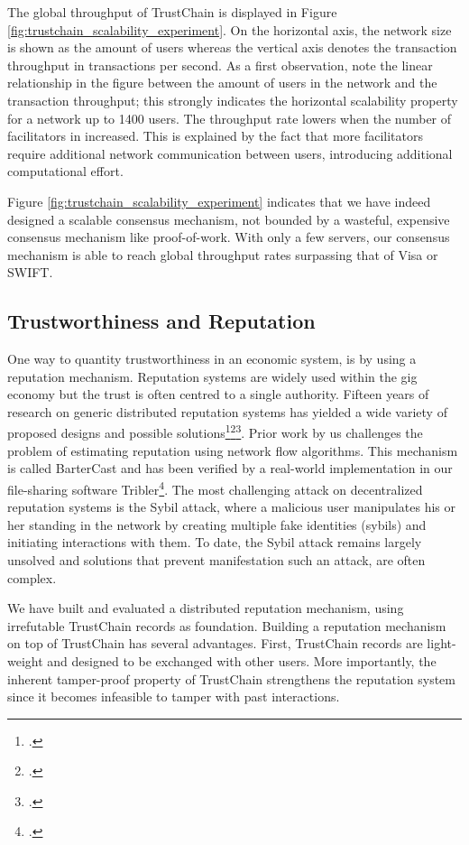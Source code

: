 \documentclass[USenglish]{article}
\begin{document}
The global throughput of TrustChain is displayed in Figure \ref{fig:trustchain_scalability_experiment}.
On the horizontal axis, the network size is shown as the amount of users whereas the vertical axis denotes the transaction throughput in transactions per second.
As a first observation, note the linear relationship in the figure between the amount of users in the network and the transaction throughput; this strongly indicates the horizontal scalability property for a network up to 1400 users.
The throughput rate lowers when the number of facilitators in increased. This is explained by the fact that more facilitators require additional network communication between users, introducing additional computational effort.

Figure \ref{fig:trustchain_scalability_experiment} indicates that we have indeed designed a scalable consensus mechanism, not bounded by a wasteful, expensive consensus mechanism like proof-of-work.
With only a few servers, our consensus mechanism is able to reach global throughput rates surpassing that of Visa or SWIFT.

\subsection{Trustworthiness and Reputation}
\label{sec:reputation}
One way to quantity trustworthiness in an economic system, is by using a reputation mechanism.
Reputation systems are widely used within the gig economy but the trust is often centred to a single authority.
Fifteen years of research on generic distributed reputation systems has yielded a wide variety of proposed designs and possible solutions\footcite{delaviz2010improving}\footcite{delaviz2012sybilres}\footcite{kamvar2003eigentrust}.
Prior work by us challenges the problem of estimating reputation using network flow algorithms.
This mechanism is called BarterCast and has been verified by a real-world implementation in our file-sharing software Tribler\footcite{meulpolder2009bartercast}.
The most challenging attack on decentralized reputation systems is the Sybil attack, where a malicious user manipulates his or her standing in the network by creating multiple fake identities (sybils) and initiating interactions with them.
To date, the Sybil attack remains largely unsolved and solutions that prevent manifestation such an attack, are often complex.

We have built and evaluated a distributed reputation mechanism, using irrefutable TrustChain records as foundation.
Building a reputation mechanism on top of TrustChain has several advantages.
First, TrustChain records are light-weight and designed to be exchanged with other users.
More importantly, the inherent tamper-proof property of TrustChain strengthens the reputation system since it becomes infeasible to tamper with past interactions.
\end{document}
